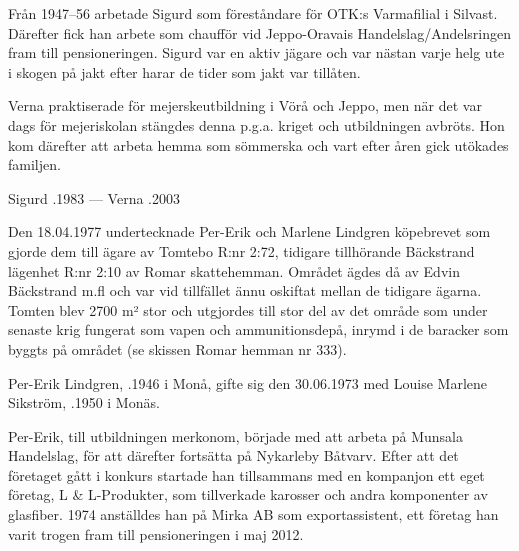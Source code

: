 Från 1947--56 arbetade Sigurd som föreståndare för OTK:s Varmafilial i Silvast. Därefter fick han arbete som chaufför vid Jeppo-Oravais Handelslag/Andelsringen fram till pensioneringen. Sigurd var en aktiv jägare och var nästan varje helg ute i skogen på jakt efter harar de tider som jakt var tillåten.

Verna praktiserade för mejerskeutbildning i Vörå och Jeppo, men när det var dags för mejeriskolan stängdes denna p.g.a. kriget och utbildningen avbröts. Hon kom därefter att arbeta hemma som sömmerska och vart efter åren gick utökades familjen.
\begin{jhchildren}
  \item {}
  \item {}
  \item {}
  \item {}
  \item {}
\end{jhchildren}

Sigurd .1983  ---  Verna .2003





Den 18.04.1977 undertecknade Per-Erik och Marlene Lindgren köpebrevet som gjorde dem till ägare av Tomtebo R:nr 2:72, tidigare tillhörande Bäckstrand lägenhet R:nr 2:10 av Romar skattehemman. Området ägdes då av Edvin Bäckstrand m.fl och var vid tillfället ännu oskiftat mellan de tidigare ägarna. Tomten blev 2700 m² stor och utgjordes till stor del av det område som under senaste krig fungerat som vapen och ammunitionsdepå, inrymd i de baracker som byggts på området (se skissen Romar hemman nr 333).

Per-Erik Lindgren, .1946 i Monå, gifte sig den 30.06.1973 med Louise Marlene Sikström, .1950 i Monäs.

Per-Erik, till utbildningen  merkonom, började med att arbeta på Munsala Handelslag, för att därefter fortsätta på Nykarleby Båtvarv. Efter att det företaget gått i konkurs startade han tillsammans med en kompanjon ett eget företag, L \& L-Produkter, som tillverkade karosser och andra komponenter av glasfiber. 1974 anställdes han på Mirka AB som exportassistent, ett företag han varit trogen fram till pensioneringen i maj 2012.

